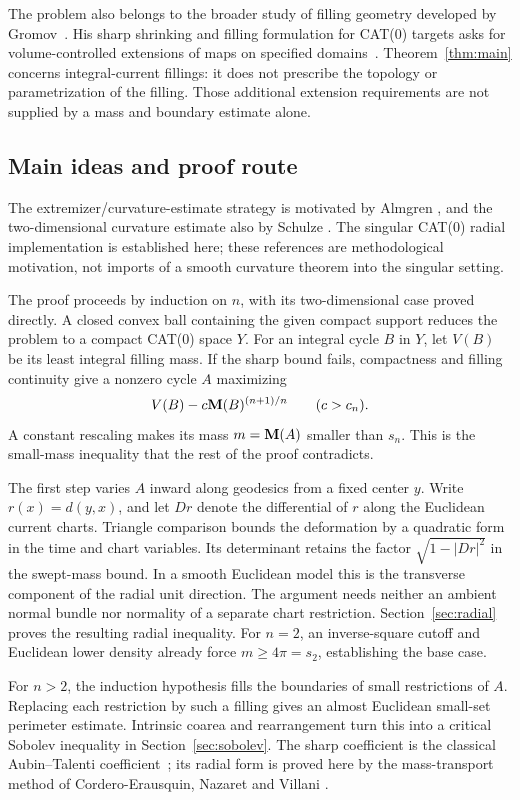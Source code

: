 The problem also belongs to the broader study of filling geometry
developed by Gromov~\cite{Gromov1983}. His sharp shrinking and filling
formulation for CAT(0) targets asks for volume-controlled extensions of
maps on specified domains~\cite[Section~2.3]{Gromov2014}.
Theorem~\ref{thm:main} concerns integral-current fillings: it does not
prescribe the topology or parametrization of the filling. Those
additional extension requirements are not supplied by a mass and
boundary estimate alone.

\subsection{Main ideas and proof route}

The extremizer/curvature-estimate strategy is motivated by Almgren
\cite[Section~0, p.~454]{Almgren1986}, and the two-dimensional
curvature estimate also by Schulze \cite[Theorem~1.4]{Schulze2020}.
The singular CAT(0) radial implementation is established here; these
references are methodological motivation, not imports of a smooth
curvature theorem into the singular setting.

The proof proceeds by induction on $n$, with its two-dimensional case
proved directly. A closed convex ball containing the given compact
support reduces the problem to a compact CAT(0) space $Y$. For an
integral cycle $B$ in $Y$, let $V(B)$ be its least integral filling mass.
If the sharp bound fails, compactness and filling continuity give a
nonzero cycle $A$ maximizing
\[
 V(B)-c\mathbf M(B)^{(n+1)/n}\qquad(c>c_n).
\]
A constant rescaling makes its mass $m=\mathbf M(A)$ smaller than $s_n$.
This is the small-mass inequality that the rest of the proof contradicts.

The first step varies $A$ inward along geodesics from a fixed center
$y$. Write $r(x)=d(y,x)$, and let $Dr$ denote the differential of $r$
along the Euclidean current charts. Triangle comparison bounds the
deformation by a quadratic form in the time and chart variables.
Its determinant retains the factor $\sqrt{1-|Dr|^2}$ in the swept-mass
bound. In a smooth Euclidean model this is the transverse component of
the radial unit direction. The argument needs neither an ambient
normal bundle nor normality of a separate chart restriction.
Section~\ref{sec:radial} proves the resulting radial inequality.
For $n=2$, an inverse-square cutoff and Euclidean lower density
already force $m\ge4\pi=s_2$, establishing the base case.

For $n>2$, the induction hypothesis fills the boundaries of small
restrictions of $A$. Replacing each restriction by such a filling
gives an almost Euclidean small-set perimeter estimate. Intrinsic
coarea and rearrangement turn this into a critical Sobolev inequality
in Section~\ref{sec:sobolev}. The sharp coefficient is the classical
Aubin--Talenti coefficient~\cite{Aubin1976,Talenti1976}; its radial
form is proved here by the mass-transport method of
Cordero-Erausquin, Nazaret and Villani
\cite[Section~2]{CorderoNazaretVillani2004}.

